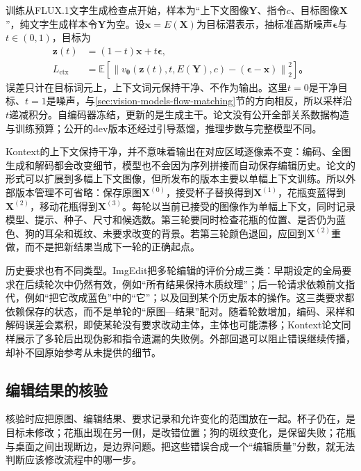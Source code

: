 训练从FLUX.1文字生成检查点开始，样本为“上下文图像$\bm{Y}$、指令$c$、目标图像$\bm{X}$”，纯文字生成样本令$\bm{Y}$为空。设$\bm{x}=E(\bm{X})$为目标潜表示，抽标准高斯噪声$\bm{\epsilon}$与$t\in(0,1)$，目标为
\begin{equation}
 \begin{aligned}
 \bm{z}(t)&=(1-t)\bm{x}+t\bm{\epsilon},\\
 L_{\mathrm{ctx}}&=
 \mathbb{E}\!\left[
 \left\lVert v_{\bm{\theta}}
  (\bm{z}(t),t,E(\bm{Y}),c)
   -(\bm{\epsilon}-\bm{x})\right\rVert_2^2
 \right]\text{。}
 \end{aligned}
 \label{eq:vision-kontext-flow}
\end{equation}
误差只计在目标词元上，上下文词元保持干净、不作为输出。这里$t=0$是干净目标、$t=1$是噪声，与\ref{sec:vision-models-flow-matching}节的方向相反，所以采样沿$t$递减积分。自编码器冻结，更新的是生成主干。论文没有公开全部关系数据构造与训练预算；公开的dev版本还经过引导蒸馏，推理步数与完整模型不同。

Kontext的上下文保持干净，并不意味着输出在对应区域逐像素不变：编码、全图生成和解码都会改变细节，模型也不会因为序列拼接而自动保存编辑历史。论文的形式可以扩展到多幅上下文图像，但所发布的版本主要以单幅上下文训练。所以外部版本管理不可省略：保存原图$\bm{X}^{(0)}$，接受杯子替换得到$\bm{X}^{(1)}$，花瓶变蓝得到$\bm{X}^{(2)}$，移动花瓶得到$\bm{X}^{(3)}$。每轮以当前已接受的图像作为单幅上下文，同时记录模型、提示、种子、尺寸和候选数。第三轮要同时检查花瓶的位置、是否仍为蓝色、狗的耳朵和斑纹、未要求改变的背景。若第三轮颜色退回，应回到$\bm{X}^{(2)}$重做，而不是把新结果当成下一轮的正确起点。

历史要求也有不同类型。ImgEdit把多轮编辑的评价分成三类：早期设定的全局要求在后续轮次中仍然有效，例如“所有结果保持木质纹理”；后一轮请求依赖前文指代，例如“把它改成蓝色”中的“它”；以及回到某个历史版本的操作。这三类要求都依赖保存的状态，而不是单轮的“原图—结果”配对。随着轮数增加，编码、采样和解码误差会累积，即使某轮没有要求改动主体，主体也可能漂移；Kontext论文同样展示了多轮后出现伪影和指令遗漏的失败例。外部回退可以阻止错误继续传播，却补不回原始参考从未提供的细节。

\subsection{编辑结果的核验}
\label{sec:vision-generation-editing-check}

核验时应把原图、编辑结果、要求记录和允许变化的范围放在一起。杯子仍在，是目标未修改；花瓶出现在另一侧，是改错位置；狗的斑纹变化，是保留失败；花瓶与桌面之间出现断边，是边界问题。把这些错误合成一个“编辑质量”分数，就无法判断应该修改流程中的哪一步。


